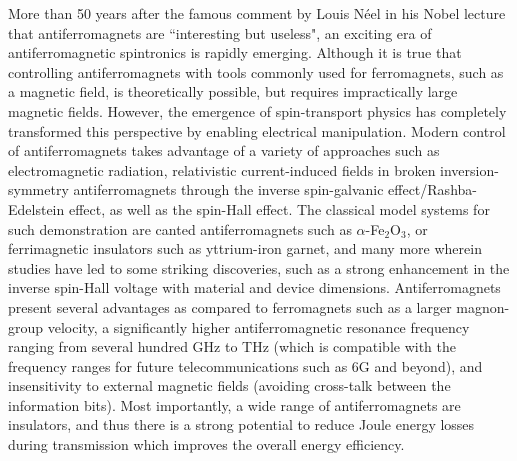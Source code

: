 \documentclass[12pt]{article}
\begin{document}
More than 50 years after the famous comment by Louis Néel in his Nobel lecture that antiferromagnets are ``interesting but useless", an exciting era of antiferromagnetic spintronics is rapidly emerging\cite{baltz2018antiferromagnetic}. Although it is true that controlling antiferromagnets with tools commonly used for ferromagnets, such as a magnetic field, is theoretically possible, but requires impractically large magnetic fields. However, the emergence of spin-transport physics has completely transformed this perspective by enabling electrical manipulation\cite{jungwirth2016antiferromagnetic}. Modern control of antiferromagnets takes advantage of a variety of approaches such as electromagnetic radiation\cite{nvemec2018antiferromagnetic}, relativistic current-induced fields in broken inversion-symmetry antiferromagnets through the inverse spin-galvanic effect/Rashba-Edelstein effect\cite{wadley2016electrical,vzelezny2014relativistic,bhattacharjee2014prediction}, as well as the spin-Hall effect\cite{duttagupta2020spin}. The classical model systems for such demonstration are canted antiferromagnets such as $\alpha$-Fe$_2$O$_3$\cite{lebrun2018tunable}, or ferrimagnetic insulators such as yttrium-iron garnet\cite{wei2022giant}, and many more\cite{han2023coherent} wherein studies have led to some striking discoveries\cite{parsonnet2022nonvolatile}, such as a strong enhancement in the inverse spin-Hall voltage with material and device dimensions\cite{wei2022giant,huang2024manipulating}. Antiferromagnets present several advantages as compared to ferromagnets such as a larger magnon-group velocity\cite{hamdi2023spin}, a significantly higher antiferromagnetic resonance frequency ranging from several hundred GHz to THz (which is compatible with the frequency ranges for future telecommunications such as 6G and beyond), and insensitivity to external magnetic fields (avoiding cross-talk between the information bits). Most importantly, a wide range of antiferromagnets are insulators, and thus there is a strong potential to reduce Joule energy losses during transmission which improves the overall energy efficiency. 
\end{document}

